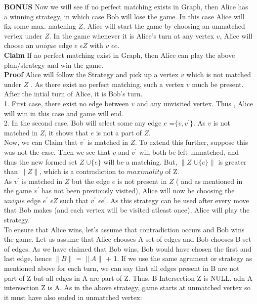 \documentclass[11pt]{article}
\begin{document}
{\bf BONUS}
Now we will see if no perfect matching exists in Graph, then Alice has a winning strategy, in which case Bob will lose the game. In this case Alice will fix some max. matching $Z$. Alice will start the game by choosing an unmatched vertex under $Z$. In the game whenever it is Alice's turn at any vertex $v$, Alice will choose an $unique$ edge $e$ $\epsilon Z$ with $v$ $\epsilon e$.\\
{\bf Claim} If no perfect matching exist in Graph, then Alice can play the above plan/strategy and win the game.\\
{\bf Proof} Alice will follow the Strategy and pick up a vertex $v$ which is not matched under $Z$ . As there exist no perfect matching, such a vertex $v$ much be present. After the intial turn of Alice, it is Bob's turn.\\
1. First case, there exist no edge between $v$ and any unvisited vertex. Thus , Alice will win in this case and game will end.\\
2. In the second case, Bob will select some any edge $e$ =$\{v,v^{'}\}$. As $v$ is not matched in $Z$, it shows that $e$ is not a part of $Z$.\\
Now, we can Claim that $v^{'}$ is matched in $Z$. To extend this further, suppose this was not the case. Then we see that $v$ and $v^{'}$ will both be left unmatched, and thus the new formed set $Z$ $\cup \{ e \}$ will be a matching. But, $\|Z$ $\cup \{ e \}\|$ is greater than $\| Z \|$, which is a contradiction to $maximality$ of Z.\\
As $v^{'}$ is matched in $Z$ but the edge $e$ is not present in $Z$ ( and as mentioned in the game $v^{'}$ has not been previously visited), Alice will now be choosing the $unique$ edge $e^{'}$ $\epsilon Z$ such that $v^{'}$ $\epsilon e^{'}$. As this strategy can be used after every move that Bob makes (and each vertex will be visited atleast once), Alice will play the strategy.\\
To ensure that Alice wins, let's assume that contradiction occurs and Bob wins the game. Let us assume that Alice chooses A set of edges and Bob chooses B set of edges. As we have claimed that Bob wins, Bob would have chosen the first and last edge, hence $\| B\|$ = $\| A\|$ + 1. If we use the same agrument or strategy as mentioned above for each turn, we can say that all edges present in B are not part of Z but all edges in A are part of Z. Thus, B Intersection Z is NULL. adn A intersection Z is A. As in the above strategy, game starts at unmatched vertex so it must have also ended in unmatched vertex:\\
\end{document}
